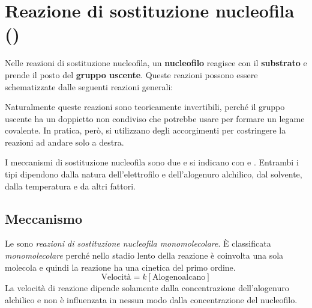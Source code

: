\section{Reazione di sostituzione nucleofila (\texorpdfstring{\mech}{SN})}
Nelle reazioni di sostituzione nucleofila, un \textbf{nucleofilo} reagisce con il \textbf{substrato} e prende il posto  del \textbf{gruppo uscente}. Queste reazioni possono essere schematizzate dalle seguenti reazioni generali:

\begin{reaction}
	\+{1em,1em}
	\arrow
	\+{1em,1em}
\end{reaction}
\begin{reaction}
	\+{1em,1em}
	\arrow
	\+{1em,1em}
\end{reaction}

Naturalmente queste reazioni sono teoricamente invertibili, perché il gruppo uscente ha un doppietto non condiviso che potrebbe usare per formare un legame covalente. In pratica, però, si utilizzano degli accorgimenti per costringere la reazioni ad andare solo a destra.

I meccanismi di sostituzione nucleofila sono due e si indicano con \mech[1] e \mech[2]. Entrambi i tipi dipendono dalla natura dell'elettrofilo e dell'alogenuro alchilico, dal solvente, dalla temperatura e da altri fattori.


\subsection{Meccanismo \texorpdfstring{\mech[1]}{SN1}}
Le \textbf{\mech[1]} sono \textit{reazioni di sostituzione nucleofila monomolecolare}. È classificata \textit{monomolecolare} perché nello stadio lento della reazione è coinvolta una sola molecola e quindi la reazione ha una cinetica del primo ordine.
\begin{equation*}
	\text{Velocità} = k\left[\text{Alogenoalcano}\right]
\end{equation*}
La velocità di reazione dipende solamente dalla concentrazione dell'alogenuro alchilico e non è influenzata in nessun modo dalla concentrazione del nucleofilo.

